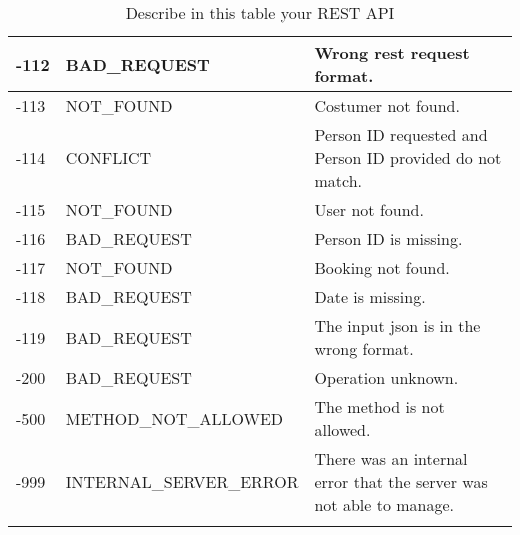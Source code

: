 \begin{longtable}{|p{}|p{} |p{}|}
-112 & BAD\_REQUEST            & Wrong rest request format. \\ \hline
-113 & NOT\_FOUND              & Costumer not found. \\ \hline
-114 & CONFLICT                & Person ID requested and Person ID provided do not match. \\ \hline
-115 & NOT\_FOUND              & User not found. \\ \hline
-116 & BAD\_REQUEST            & Person ID is missing. \\ \hline
-117 & NOT\_FOUND              & Booking not found. \\ \hline
-118 & BAD\_REQUEST            & Date is missing. \\ \hline
-119 & BAD\_REQUEST            & The input json is in the wrong format. \\ \hline
-200 & BAD\_REQUEST            & Operation unknown. \\ \hline
-500 & METHOD\_NOT\_ALLOWED    & The method is not allowed. \\ \hline
-999 & INTERNAL\_SERVER\_ERROR & There was an internal error that the server was not able to manage. \\ \hline

\caption{Describe in this table your REST API}
\label{tab:termGlossary}
\end{longtable}